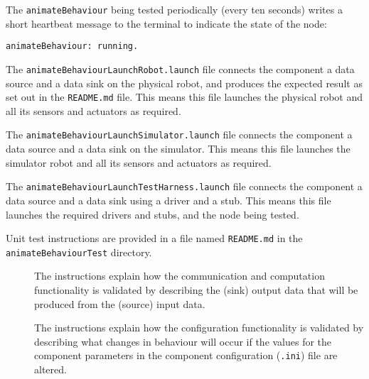 \documentclass{CSSRforAfrica}
\newcommand{\checkboxChecked}{\fbox{\ding{51}}} %
\newcommand{\checkboxDashed}{\fbox{--}}         %
\begin{document}
\begin{description}
\newpage
\item[\checkboxChecked]  The {\small \verb+animateBehaviour+} being tested periodically (every ten seconds) writes a short heartbeat message to
 the terminal to indicate the state of the node:
\begin{verbatim}
animateBehaviour: running.
\end{verbatim}

\item[\checkboxDashed] The {\small \verb+animateBehaviourLaunchRobot.launch+} file  connects the component a data source and a data sink on the physical robot, and produces the expected result as set out in the  {\small \verb+README.md+}  file.    This means this file launches the physical robot and all its sensors and actuators as required.

\item[\checkboxDashed] The {\small \verb+animateBehaviourLaunchSimulator.launch+} file  connects the component a data source and a data sink on the simulator.   This means this file launches the simulator robot and all its sensors and actuators as required.

\item[\checkboxDashed] The {\small \verb+animateBehaviourLaunchTestHarness.launch+} file  connects the component a data source and a data sink using a driver and a stub.   This means this file launches the required drivers and stubs, and the node being tested.

\item[\checkboxChecked] Unit test instructions are provided in a file named {\small \verb+README.md+} in the  {\small \verb+animateBehaviourTest+} directory. 


\begin{description}

\item[\checkboxChecked] The instructions explain how the communication and computation functionality is validated by describing the (sink) output data that will be produced from the (source) input data.  

\item[\checkboxChecked] The instructions explain how the configuration functionality is validated by describing what changes in behaviour will occur if the values for the component parameters in the component configuration ({\small \verb+.ini+}) file are altered.

\end{description}

\end{description} 
\end{document}

